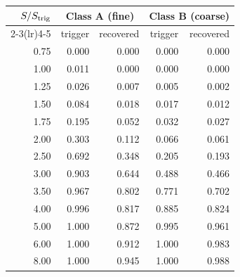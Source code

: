 \begin{tabular}{@{}r rr rr@{}}
\toprule
$S/S_{\rm trig}$ & \multicolumn{2}{c}{Class A (fine)} & \multicolumn{2}{c}{Class B (coarse)} \\
\cmidrule(lr){2-3}\cmidrule(lr){4-5}
 & trigger & recovered & trigger & recovered \\
\midrule
0.75 & 0.000 & 0.000 & 0.000 & 0.000 \\
1.00 & 0.011 & 0.000 & 0.000 & 0.000 \\
1.25 & 0.026 & 0.007 & 0.005 & 0.002 \\
1.50 & 0.084 & 0.018 & 0.017 & 0.012 \\
1.75 & 0.195 & 0.052 & 0.032 & 0.027 \\
2.00 & 0.303 & 0.112 & 0.066 & 0.061 \\
2.50 & 0.692 & 0.348 & 0.205 & 0.193 \\
3.00 & 0.903 & 0.644 & 0.488 & 0.466 \\
3.50 & 0.967 & 0.802 & 0.771 & 0.702 \\
4.00 & 0.996 & 0.817 & 0.885 & 0.824 \\
5.00 & 1.000 & 0.872 & 0.995 & 0.961 \\
6.00 & 1.000 & 0.912 & 1.000 & 0.983 \\
8.00 & 1.000 & 0.945 & 1.000 & 0.988 \\
\bottomrule
\end{tabular}
